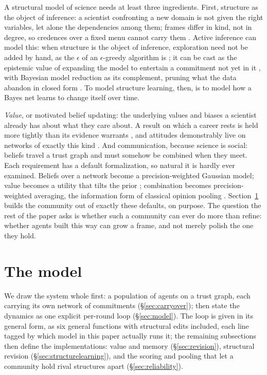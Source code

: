 \documentclass[runningheads]{llncs}
\begin{document}
A structural model of science needs at least three ingredients. First, structure as the
object of inference: a scientist confronting a
new domain is not given the right variables, let alone the dependencies among them; frames
differ in kind, not in degree, so credences over a fixed menu cannot carry them
\citep{ullman2020,kemp2008form,ullman2012}. Active inference can model this: when
structure is the object of inference, exploration need not be added by hand, as the
$\epsilon$ of an $\epsilon$-greedy algorithm is
\citep{zollman2010,oconnor2019}; it can be cast as the epistemic value of expanding the
model to entertain a commitment not yet in it \citep{friston2015,friston2017curiosity}, with
Bayesian model reduction as its complement, pruning what the data abandon in closed form
\citep{friston2018bmr,neacsu2022}. To model structure learning, then, is to model how a Bayes
net learns to change itself over time.

\emph{Value}, or motivated belief updating: the underlying values and biases a scientist
already has about what they care about. A result on which a career rests
is held more tightly than its evidence warrants \citep{kitcher1990,strevens2003}, and attitudes
demonstrably live on networks of exactly this kind \citep{dalege2016}. And communication,
because science is social: beliefs travel a trust graph and must somehow be combined when they
meet. Each requirement has a default formalization, so natural it is hardly ever examined.
Beliefs over a network become a precision-weighted Gaussian model; value becomes a utility that
tilts the prior \citep{hyland2025}; combination becomes precision-weighted averaging, the
information form of classical opinion pooling \citep{degroot1974,genest1986}.
Section~\ref{sec:bmebmr} builds the community out of exactly these defaults, on purpose. The
question the rest of the paper asks is whether such a community can ever do more than
refine: whether agents built this way can grow a frame, and not merely polish the one
they hold.

\section{The model}
\label{sec:bmebmr}

We draw the system whole first: a population of agents on a trust graph, each carrying its own
network of commitments (\S\ref{sec:carryover}); then state the dynamics as one explicit
per-round loop (\S\ref{sec:model}). The loop is given in its general form, as six
general functions with structural edits included, each line tagged by which model in this
paper actually runs it; the remaining subsections then define the implementations: value and
memory (\S\ref{sec:revision}), structural revision (\S\ref{sec:structurelearning}), and the
scoring and pooling that let a community hold rival structures apart
(\S\ref{sec:reliability}).
\end{document}
